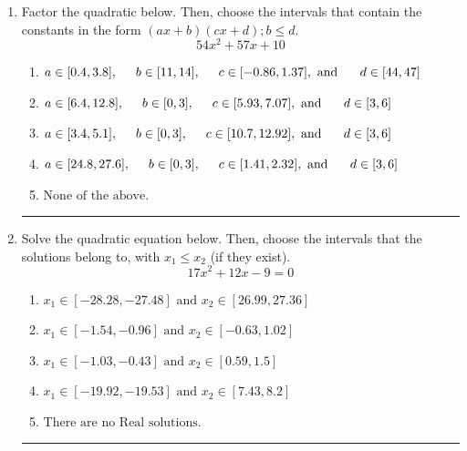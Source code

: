 \documentclass[14pt]{extbook}
\newcommand{\litem}[1]{\item#1\hspace*{-1cm}\rule{\textwidth}{0.4pt}}
\begin{document}
\begin{enumerate}
\litem{
Factor the quadratic below. Then, choose the intervals that contain the constants in the form $(ax+b)(cx+d); b \leq d.$\[ 54x^{2} +57 x + 10 \]\begin{enumerate}[label=\Alph*.]
\item \( a \in [0.4, 3.8], \hspace*{5mm} b \in [11, 14], \hspace*{5mm} c \in [-0.86, 1.37], \text{ and } \hspace*{5mm} d \in [44, 47] \)
\item \( a \in [6.4, 12.8], \hspace*{5mm} b \in [0, 3], \hspace*{5mm} c \in [5.93, 7.07], \text{ and } \hspace*{5mm} d \in [3, 6] \)
\item \( a \in [3.4, 5.1], \hspace*{5mm} b \in [0, 3], \hspace*{5mm} c \in [10.7, 12.92], \text{ and } \hspace*{5mm} d \in [3, 6] \)
\item \( a \in [24.8, 27.6], \hspace*{5mm} b \in [0, 3], \hspace*{5mm} c \in [1.41, 2.32], \text{ and } \hspace*{5mm} d \in [3, 6] \)
\item \( \text{None of the above.} \)

\end{enumerate} }
\litem{
Solve the quadratic equation below. Then, choose the intervals that the solutions belong to, with $x_1 \leq x_2$ (if they exist).\[ 17x^{2} +12 x -9 = 0 \]\begin{enumerate}[label=\Alph*.]
\item \( x_1 \in [-28.28, -27.48] \text{ and } x_2 \in [26.99, 27.36] \)
\item \( x_1 \in [-1.54, -0.96] \text{ and } x_2 \in [-0.63, 1.02] \)
\item \( x_1 \in [-1.03, -0.43] \text{ and } x_2 \in [0.59, 1.5] \)
\item \( x_1 \in [-19.92, -19.53] \text{ and } x_2 \in [7.43, 8.2] \)
\item \( \text{There are no Real solutions.} \)


\end{enumerate}}
\end{enumerate}
\end{document}
